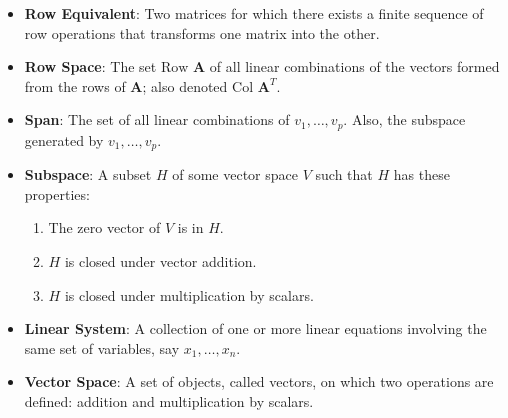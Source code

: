 \begin{itemize}
    \item \textbf{Row Equivalent}: Two matrices for which there exists a finite sequence of row operations that transforms one matrix into the other.
    \item \textbf{Row Space}: The set $\text{Row }\mathbf{A}$ of all linear combinations of the vectors formed from the rows of $\mathbf{A}$; also denoted $\text{Col }\mathbf{A}^T$.
    \item \textbf{Span}: The set of all linear combinations of $v_1, \dots, v_p$. Also, the subspace generated by $v_1, \dots, v_p$.
    \item \textbf{Subspace}: A subset $H$ of some vector space $V$ such that $H$ has these properties:
        \begin{enumerate}
            \item The zero vector of $V$ is in $H$.
            \item $H$ is closed under vector addition.
            \item $H$ is closed under multiplication by scalars.
        \end{enumerate}
    \item \textbf{Linear System}: A collection of one or more linear equations involving the same set of variables, say $x_1, \dots, x_n$.
    \item \textbf{Vector Space}: A set of objects, called vectors, on which two operations are defined: addition and multiplication by scalars.
\end{itemize}
